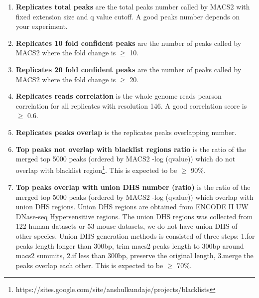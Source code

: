 \begin{enumerate}
 \item{\textbf{Replicates total peaks} are the total peaks number called by MACS2 with fixed extension size and q value cutoff. A good peaks number depends on your experiment.}
 \item{\textbf{Replicates 10 fold confident peaks} are the number of peaks called by MACS2 where the fold change is $\geq$ 10.}
 \item{\textbf{Replicates 20 fold confident peaks} are the number of peaks called by MACS2 where the fold change is $\geq$ 20.}   

 \item{\textbf{Replicates reads correlation} is the whole genome reads pearson correlation for all replicates with resolution 146. A good correlation score is $\geq$ 0.6.}
 \item{\textbf{Replicates peaks overlap} is the replicates peaks overlapping number.}

 \item{\textbf{Top peaks not overlap with blacklist regions ratio} is the ratio of the merged top 5000 peaks (ordered by MACS2 -log (qvalue)) which do not overlap with blacklist region\footnote{https://sites.google.com/site/anshulkundaje/projects/blacklists}. This is expected to be $\geq$ 90$\%$.}
   
 \item{\textbf{Top peaks overlap with union DHS number (ratio)} is the ratio of the merged top 5000 peaks (ordered by MACS2 -log (qvalue)) which overlap with union DHS regions. Union DHS regions are obtained from ENCODE II UW DNase-seq Hypersensitive regions. The union DHS regions was collected from 122 human datasets or 53 mouse datasets, we do not have union DHS of other species. Union DHS generation methods is consisted of three steps: 1.for peaks length longer than 300bp, trim macs2 peaks length to 300bp around macs2 summits, 2.if less than 300bp, preserve the original length, 3.merge the peaks overlap each other. This is expected to be $\geq$ 70$\%$.}


\end{enumerate}
